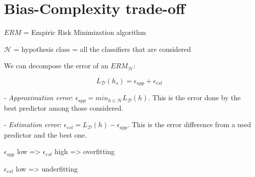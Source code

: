 \section*{Bias-Complexity trade-off}

\label{sec:bias-complexity-trade-off}

\vspace{5mm}

$ERM$ = Empiric Risk Minimization algorithm

$\mathcal{H}$ = hypothesis class = all the classifiers that are considered

\vspace{5mm}

We can decompose the error of an $ERM_\mathcal{H}$:

$$L_{\mathcal{D}}(h_s) = \epsilon_{app} + \epsilon_{est}$$

- \textit{Approximation error}: $\epsilon_{app} = min_{h \in \mathcal{H}} L_{\mathcal{D}}(h)$. This is the error done by the best predictor among those considered.

- \textit{Estimation error}: $\epsilon_{est} = L_{\mathcal{D}}(h) - \epsilon_{app}$. This is the error difference from a used predictor and the best one.

$\epsilon_{app}$ low => $\epsilon_{est}$ high => overfitting

$\epsilon_{est}$ low => underfitting

\vspace{5mm}